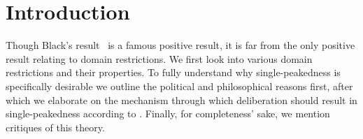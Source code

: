 \newpage
\chapter{Introduction}
\label{Introduction}

Though Black's result~\citep{blackRationaleGroupDecisionmaking1948} is a famous positive result, it is far from the only positive result relating to domain restrictions. We first look into various domain restrictions and their properties. To fully understand why single-peakedness is specifically desirable we outline the political and philosophical reasons first, after which we elaborate on the mechanism through which deliberation should result in single-peakedness according to \citet{listTwoConceptsAgreement2002}. Finally, for completeness' sake, we mention critiques of this theory.

